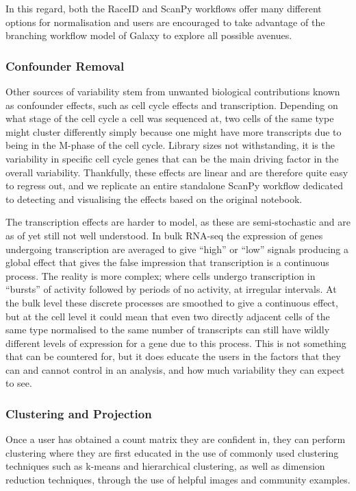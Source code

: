 \documentclass[a4paper,num-refs]{oup-contemporary}
\begin{document}
In this regard, both the RaceID and ScanPy workflows offer many different options for normalisation and users are encouraged to take advantage of the branching workflow model of Galaxy to explore all possible avenues.

\subsubsection{Confounder Removal}
Other sources of variability stem from unwanted biological contributions known as confounder effects, such as cell cycle effects and transcription. Depending on what stage of the cell cycle a cell was sequenced at, two cells of the same type might cluster differently simply because one might have more transcripts due to being in the M-phase of the cell cycle. Library sizes not withstanding, it is the variability in specific cell cycle genes that can be the main driving factor in the overall variability. Thankfully, these effects are linear and are therefore quite easy to regress out, and we replicate an entire standalone ScanPy workflow dedicated to detecting and visualising the effects based on the original notebook.

The transcription effects are harder to model, as these are semi-stochastic and are as of yet still not well understood. In bulk RNA-seq the expression of genes undergoing transcription are averaged to give ``high'' or ``low'' signals producing a global effect that gives the false impression that transcription is a continuous process. The reality is more complex; where cells undergo transcription in ``bursts'' of activity followed by periods of no activity, at irregular intervals. At the bulk level these discrete processes are smoothed to give a continuous effect, but at the cell level it could mean that even two directly adjacent cells of the same type normalised to the same number of transcripts can still have wildly different levels of expression for a gene due to this process. This is not something that can be countered for, but it does educate the users in the factors that they can and cannot control in an analysis, and how much variability they can expect to see.

\subsubsection{Clustering and Projection}
Once a user has obtained a count matrix they are confident in, they can perform clustering where they are first educated in the use of commonly used clustering techniques such as k-means and hierarchical clustering, as well as dimension reduction techniques, through the use of helpful images and community examples.
\end{document}
